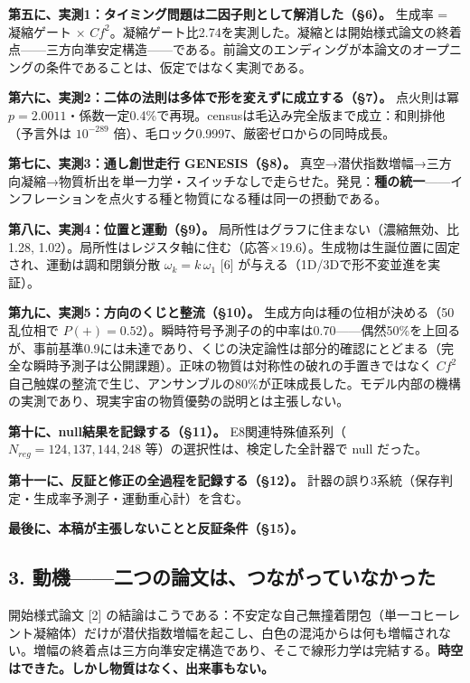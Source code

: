 \documentclass[
  a4paper,
]{ltjsarticle}
\begin{document}
\textbf{第五に、実測1：タイミング問題は二因子則として解消した（§6）。}
生成率 = 凝縮ゲート ×
\(Cf^2\)。凝縮ゲート比2.74を実測した。凝縮とは開始様式論文の終着点------三方向準安定構造------である。前論文のエンディングが本論文のオープニングの条件であることは、仮定ではなく実測である。

\textbf{第六に、実測2：二体の法則は多体で形を変えずに成立する（§7）。}
点火則は冪
\(p=2.0011\)・係数一定0.4\%で再現。censusは毛込み完全版まで成立：和則排他（予言外は
\(10^{-289}\) 倍）、毛ロック0.9997、厳密ゼロからの同時成長。

\textbf{第七に、実測3：通し創世走行 GENESIS（§8）。}
真空→潜伏指数増幅→三方向凝縮→物質析出を単一力学・スイッチなしで走らせた。発見：\textbf{種の統一}------インフレーションを点火する種と物質になる種は同一の摂動である。

\textbf{第八に、実測4：位置と運動（§9）。}
局所性はグラフに住まない（濃縮無効、比1.28,
1.02）。局所性はレジスタ軸に住む（応答×19.6）。生成物は生誕位置に固定され、運動は調和閉鎖分散
\(\omega_k=k\,\omega_1\) {[}6{]} が与える（1D/3Dで形不変並進を実証）。

\textbf{第九に、実測5：方向のくじと整流（§10）。}
生成方向は種の位相が決める（50乱位相で
\(P(+)=0.52\)）。瞬時符号予測子の的中率は0.70------偶然50\%を上回るが、事前基準0.9には未達であり、くじの決定論性は部分的確認にとどまる（完全な瞬時予測子は公開課題）。正味の物質は対称性の破れの手置きではなく
\(Cf^2\)
自己触媒の整流で生じ、アンサンブルの80\%が正味成長した。モデル内部の機構の実測であり、現実宇宙の物質優勢の説明とは主張しない。

\textbf{第十に、null結果を記録する（§11）。}
E8関連特殊値系列（\(N_{reg}=124,137,144,248\)
等）の選択性は、検定した全計器で null だった。

\textbf{第十一に、反証と修正の全過程を記録する（§12）。}
計器の誤り3系統（保存判定・生成率予測子・運動重心計）を含む。

\textbf{最後に、本稿が主張しないことと反証条件（§15）。}

\subsection{3.
動機------二つの論文は、つながっていなかった}\label{ux52d5ux6a5fux4e8cux3064ux306eux8ad6ux6587ux306fux3064ux306aux304cux3063ux3066ux3044ux306aux304bux3063ux305f}

開始様式論文 {[}2{]}
の結論はこうである：不安定な自己無撞着閉包（単一コヒーレント凝縮体）だけが潜伏指数増幅を起こし、白色の混沌からは何も増幅されない。増幅の終着点は三方向準安定構造であり、そこで線形力学は完結する。\textbf{時空はできた。しかし物質はなく、出来事もない。}
\end{document}
